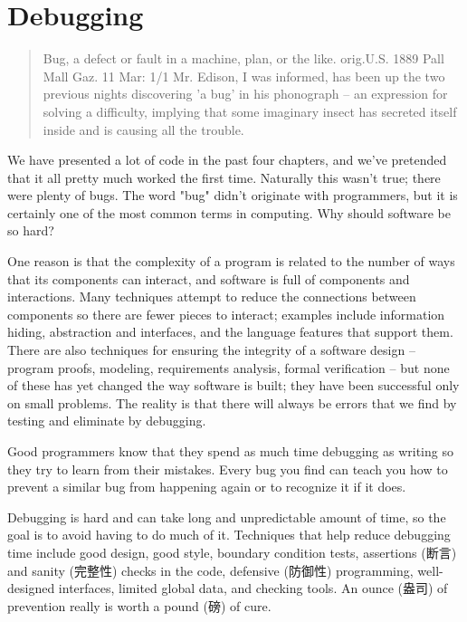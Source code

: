 \chapter{Debugging}
\label{chap:debug}
\begin{quote}
    Bug, a defect or fault in a machine, plan, or the like. orig.U.S. 1889
    Pall Mall Gaz. 11 Mar: 1/1 Mr. Edison, I was informed, has been up the
    two previous nights discovering 'a bug' in his phonograph -- an
    expression for solving a difficulty, implying that some imaginary
    insect has secreted itself inside and is causing all the trouble.
\end{quote}

\begin{quotesrc}
\end{quotesrc}

We have presented a lot of code in the past four chapters, and we've
pretended that it all pretty much worked the first time. Naturally this
wasn't true; there were plenty of bugs. The word "bug" didn't originate
with programmers, but it is certainly one of the most common terms in
computing. Why should software be so hard?

One reason is that the complexity of a program is related to the number of
ways that its components can interact, and software is full of components
and interactions. Many techniques attempt to reduce the connections between
components so there are fewer pieces to interact; examples include
information hiding, abstraction and interfaces, and the language features
that support them. There are also techniques for ensuring the integrity of
a software design -- program proofs, modeling, requirements analysis,
formal verification -- but none of these has yet changed the way software
is built; they have been successful only on small problems. The reality is
that there will always be errors that we find by testing and eliminate by
debugging.

Good programmers know that they spend as much time debugging as writing so
they try to learn from their mistakes. Every bug you find can teach you how
to prevent a similar bug from happening again or to recognize it if it
does.

Debugging is hard and can take long and unpredictable amount of time, so
the goal is to avoid having to do much of it. Techniques that help reduce
debugging time include good design, good style, boundary condition tests,
assertions (断言) and sanity (完整性) checks in the code, defensive
(防御性) programming, well-designed interfaces, limited global data, and
checking tools. An ounce (盎司) of prevention really is worth a pound (磅)
of cure.

